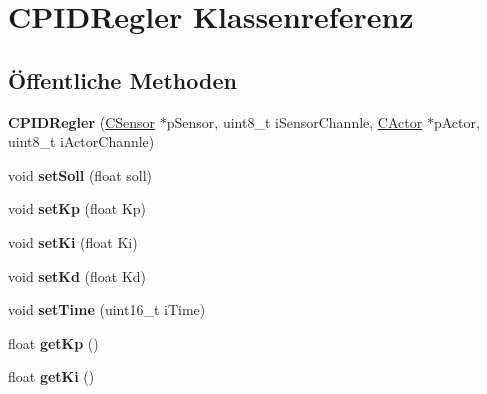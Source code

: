\hypertarget{class_c_p_i_d_regler}{\section{\-C\-P\-I\-D\-Regler \-Klassenreferenz}
\label{class_c_p_i_d_regler}
}
\subsection*{Öffentliche \-Methoden}
\begin{DoxyCompactItemize}
\item 
\hypertarget{class_c_p_i_d_regler_aba10334ff96913dd5b4897bf66f180b3}{{\bfseries \-C\-P\-I\-D\-Regler} (\hyperlink{class_c_sensor}{\-C\-Sensor} $\ast$p\-Sensor, uint8\-\_\-t i\-Sensor\-Channle, \hyperlink{class_c_actor}{\-C\-Actor} $\ast$p\-Actor, uint8\-\_\-t i\-Actor\-Channle)}\label{class_c_p_i_d_regler_aba10334ff96913dd5b4897bf66f180b3}

\item 
\hypertarget{class_c_p_i_d_regler_a907fe2535c7e05c8e5696e4e2d2f2c12}{void {\bfseries set\-Soll} (float soll)}\label{class_c_p_i_d_regler_a907fe2535c7e05c8e5696e4e2d2f2c12}

\item 
\hypertarget{class_c_p_i_d_regler_a7dad8bea3f3437fa6eb2a3d3d6b7e4ca}{void {\bfseries set\-Kp} (float \-Kp)}\label{class_c_p_i_d_regler_a7dad8bea3f3437fa6eb2a3d3d6b7e4ca}

\item 
\hypertarget{class_c_p_i_d_regler_a0fd9b03d63acba128df6a42ae3912102}{void {\bfseries set\-Ki} (float \-Ki)}\label{class_c_p_i_d_regler_a0fd9b03d63acba128df6a42ae3912102}

\item 
\hypertarget{class_c_p_i_d_regler_a75f7733582c014ec2d0a39e974635060}{void {\bfseries set\-Kd} (float \-Kd)}\label{class_c_p_i_d_regler_a75f7733582c014ec2d0a39e974635060}

\item 
\hypertarget{class_c_p_i_d_regler_a70cfefe00f0d6624fb3a8ea826b29ea9}{void {\bfseries set\-Time} (uint16\-\_\-t i\-Time)}\label{class_c_p_i_d_regler_a70cfefe00f0d6624fb3a8ea826b29ea9}

\item 
\hypertarget{class_c_p_i_d_regler_ac3bfef2e23e79b195d4e0726ea96524c}{float {\bfseries get\-Kp} ()}\label{class_c_p_i_d_regler_ac3bfef2e23e79b195d4e0726ea96524c}

\item 
\hypertarget{class_c_p_i_d_regler_aa9200343d94310765d4d6e6ba8b6bb30}{float {\bfseries get\-Ki} ()}\label{class_c_p_i_d_regler_aa9200343d94310765d4d6e6ba8b6bb30}


\end{DoxyCompactItemize}
